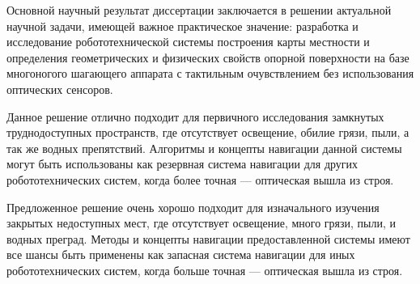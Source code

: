 
Основной  научный  результат  диссертации  заключается  в  решении  актуальной 
научной  задачи,  имеющей  важное  практическое  значение: разработка и исследование робототехнической системы построения карты местности и определения геометрических и физических свойств опорной поверхности на базе многоногого шагающего аппарата с тактильным очувствлением без использования оптических сенсоров.

Данное решение отлично подходит для первичного исследования замкнутых труднодоступных пространств, где отсутствует освещение, обилие грязи, пыли, а так же водных препятствий. Алгоритмы и концепты навигации данной системы могут быть использованы как резервная система навигации для других робототехнических систем, когда более точная --- оптическая вышла из строя.


Предложенное решение очень хорошо подходит для изначального изучения закрытых недоступных мест, где отсутствует освещение, много грязи, пыли, и водных преград. Методы и концепты навигации предоставленной системы имеют все шансы быть применены как запасная система навигации для иных робототехнических систем, когда больше точная --- оптическая вышла из строя.

